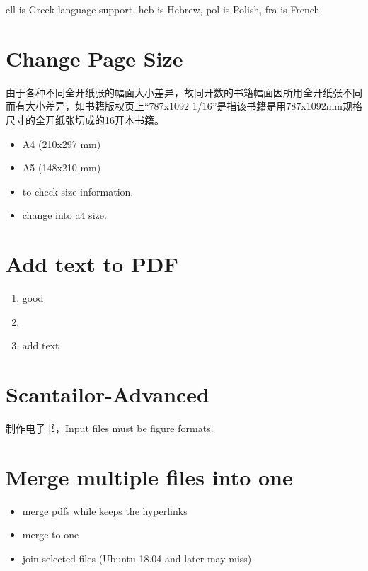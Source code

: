 ell is Greek language support. heb is Hebrew, pol is Polish, fra is French

\section{Change Page Size}

由于各种不同全开纸张的幅面大小差异，故同开数的书籍幅面因所用全开纸张不同而有大小差异，如书籍版权页上“787x1092 1/16”是指该书籍是用787x1092mm规格尺寸的全开纸张切成的16开本书籍。

\begin{itemize}
\item A4 (210x297 mm)
\item A5 (148x210 mm)
\item{} to check size information.\\
\item{} change into a4 size.
\end{itemize}

\section{Add text to PDF}
\begin{enumerate}
\item{} good
\item{}
\item{} add text
\end{enumerate}

\section{Scantailor-Advanced}

制作电子书，Input files must be figure formats.

\section{Merge multiple files into one}
\begin{itemize}
\item {} merge pdfs while keeps the hyperlinks
\item {} merge to one
\item {} join selected files (Ubuntu 18.04 and later may miss)
\end{itemize}

